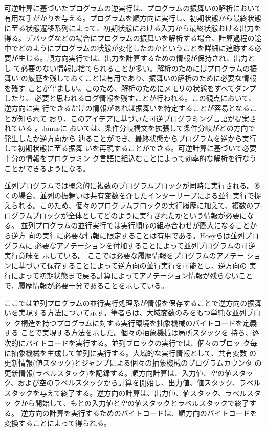 \documentclass[submit,PRO]{ipsj}
\begin{document}
可逆計算に基づいたプログラムの逆実行は、プログラムの振舞いの解析において
有用な手がかりを与える。プログラムを順方向に実行し、初期状態から最終状態
に至る状態遷移系列によって、初期状態における入力から最終状態おける出力を
得る。デバッグなどの場合にプログラムの振舞いを解析する場合、計算過程の途
中でどのようにプログラムの状態が変化したのかということを詳細に追跡する必
要が生じる。順方向実行では、出力を計算するための情報が保持され、出力とし
て必要のない情報は捨てられることが多い。解析のためにはプログラムの振舞い
の履歴を残しておくことは有用であり、振舞いの解析のために必要な情報を残す
ことが望ましい。このため、解析のためにメモリの状態をすべてダンプしたり、
必要と思われるログ情報を残すことが行われる。この観点において、逆方向に実
行できるだけの情報があれば振舞いを特定することが容易となることが知られて
おり、このアイデアに基づいた可逆プログラミング言語が提案されている
\cite{DBLP:journals/entcs/Yokoyama10,DBLP:conf/ifl/ThomsenA15}。Janusに
おいては、条件分岐構文を拡張して条件分岐がどの方向で発生したか逆方向から
辿ることができ、最終状態からプログラムを逆から実行して初期状態に至る振舞
いを再現することができる。可逆計算に基づいて必要十分の情報をプログラミン
グ言語に組込むことによって効率的な解析を行なうことができるようになる。

並列プログラムでは概念的に複数のプログラムブロックが同時に実行される。多
くの場合、並列の振舞いは共有変数を介したインターリーブによる並行実行で捉
えられる。このため、個々のプログラムブロックの実行履歴に加えて、複数のプ
ログラムブロックが全体としてどのように実行されたかという情報が必要になる。
並列プログラムの並行実行では実行順序の組み合わせが膨大になることから逆方
向の実行に必要な情報に限定することは有用である。Hoeyらは並列プログラムに
必要なアノテーションを付加することによって並列プログラムの可逆実行意味を
示している\cite{DBLP:journals/corr/abs-1808-08651,Hoey20PHD}。
ここでは必要な履歴情報をプログラムのアノテー
ションに基づいて保存することによって逆方向の並行実行を可能とし、逆方向の
実行によって初期状態まで戻る計算によってアノテーション情報が残らないこと
で、履歴情報が必要十分であることを示している。

ここでは並列プログラムの並行実行処理系が情報を保存することで逆方向の振舞
いを実現する方法について示す。筆者らは、大域変数のみをもつ単純な並列ブロッ
ク構造を持つプログラムに対する実行環境を抽象機械のバイトコードを定義する
ことで実現する方法を示した\cite{DBLP:conf/rc/IkedaY20}。個々の抽象機械は局所スタックを
持ち、逐次的にバイトコードを実行する。並列ブロックの実行では、個々のブロッ
ク毎に抽象機械を生成して並列に実行する。大域的な実行情報として、共有変数
の更新情報(値スタック)とジャンプによる個々の抽象機械のプログラムカウンタ
の更新情報(ラベルスタック)を記録する。順方向計算は、入力値、空の値スタッ
ク、および空のラベルスタックから計算を開始し、出力値、値スタック、ラベル
スタックを与えて終了する。逆方向の計算は、出力値、値スタック、ラベルスタッ
クから開始して、もとの入力値と空の値スタックとラベルスタックで終了する。
逆方向の計算を実行するためのバイトコードは、順方向のバイトコードを
変換することによって得られる。
\end{document}

